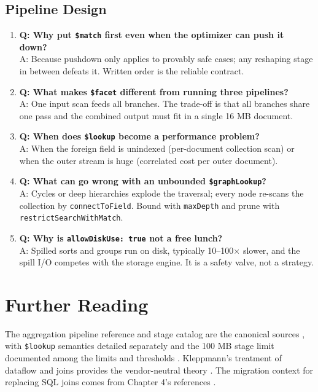 \subsection{Pipeline Design}
\begin{enumerate}
    \item \textbf{Q: Why put \texttt{\$match} first even when the optimizer can push it down?}\\
    A: Because pushdown only applies to provably safe cases; any reshaping stage in between defeats it. Written order is the reliable contract.

    \item \textbf{Q: What makes \texttt{\$facet} different from running three pipelines?}\\
    A: One input scan feeds all branches. The trade-off is that all branches share one pass and the combined output must fit in a single 16 MB document.

    \item \textbf{Q: When does \texttt{\$lookup} become a performance problem?}\\
    A: When the foreign field is unindexed (per-document collection scan) or when the outer stream is huge (correlated cost per outer document).

    \item \textbf{Q: What can go wrong with an unbounded \texttt{\$graphLookup}?}\\
    A: Cycles or deep hierarchies explode the traversal; every node re-scans the collection by \texttt{connectToField}. Bound with \texttt{maxDepth} and prune with \texttt{restrictSearchWithMatch}.

    \item \textbf{Q: Why is \texttt{allowDiskUse: true} not a free lunch?}\\
    A: Spilled sorts and groups run on disk, typically 10--100$\times$ slower, and the spill I/O competes with the storage engine. It is a safety valve, not a strategy.
\end{enumerate}

\section{Further Reading}
The aggregation pipeline reference and stage catalog are the canonical sources \cite{mongodbAggregationDocs}, with \texttt{\$lookup} semantics detailed separately \cite{mongodbLookupDocs} and the 100 MB stage limit documented among the limits and thresholds \cite{mongodbLimitsDocs}. Kleppmann's treatment of dataflow and joins provides the vendor-neutral theory \cite{kleppmann2017ddia}. The migration context for replacing SQL joins comes from Chapter 4's references \cite{mongodbRelationalMigratorDocs}.

